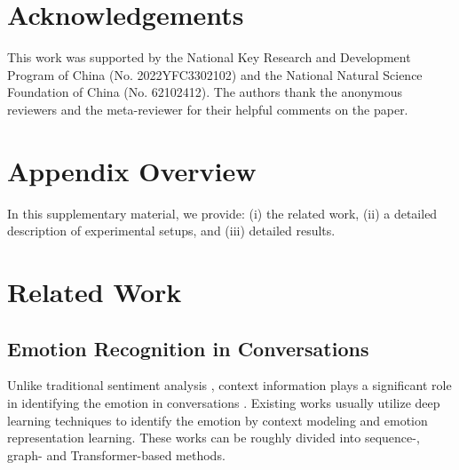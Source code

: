 \documentclass[11pt]{article}
\begin{document}
\section*{Acknowledgements}
This work was supported by the National Key Research and Development Program of China (No. 2022YFC3302102) and the National Natural Science Foundation of China (No. 62102412).
The authors thank the anonymous reviewers and the meta-reviewer for their helpful comments on the paper.




\clearpage
\appendix




\section*{Appendix Overview}
In this supplementary material, we provide: 
(i) the related work, 
(ii) a detailed description of experimental setups,
and (iii) detailed results.

\section{Related Work}
\subsection{Emotion Recognition in Conversations}
Unlike traditional sentiment analysis \citep{DBLP:conf/ijcai/ZhouHGHH19,wei2020hierarchical,DBLP:conf/semeval/0001ZDYZJMS22,DBLP:conf/coling/LiZZLYLH22}, context information plays a significant role in identifying the emotion in conversations \cite{DBLP:journals/access/PoriaMMH19}.
Existing works usually 
utilize deep learning techniques to 
identify the emotion by context modeling and emotion representation learning.
These works can be roughly divided into sequence-, graph- and Transformer-based methods.
\end{document}
